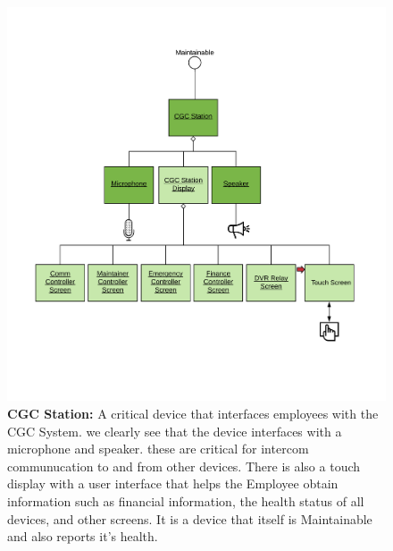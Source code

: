 \documentclass[12pt]{article}
\begin{document}
\begin{figure}[H]
    \centerline{\includegraphics[scale=.20]{CGCStation.png}}
    \caption{\textbf{CGC Station: } A critical device that interfaces employees with the CGC System. we 
clearly see that the device interfaces with a microphone and speaker. these are critical for 
intercom communucation to and from other devices. There is also a touch display with a user interface 
that helps the Employee  obtain information such as financial information, the health status of all 
devices, and other screens. It is a device that itself is Maintainable and also reports it's health.}
    \label{fig:CGCStation}
\end{figure}
  
\end{document}
